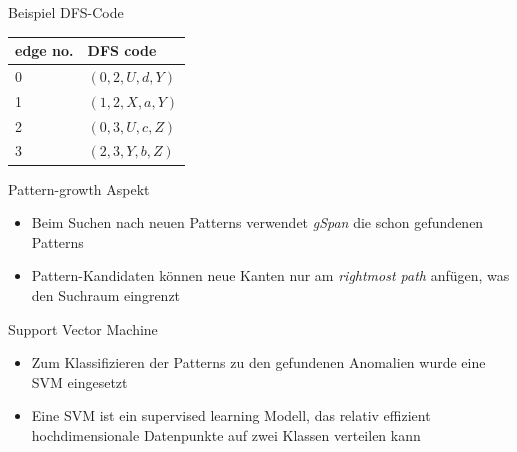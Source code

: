 \documentclass{beamer}
\begin{document}
\begin{frame}{Beispiel DFS-Code}
\begin{figure}
    \centering
    \label{fig:example_graph_dfs}
\end{figure}
\begin{table}[h]
    \centering
    \label{table:dummy_min_dfs_codes}
    \begin{tabular}{l|l}
        edge no. & DFS code          \\ \hline
        0        & $(0,2,U,d,Y)$     \\
        1        & $(1, 2, X, a, Y)$ \\
        2        & $(0, 3, U, c,Z)$  \\
        3        & $(2, 3, Y, b, Z)$
    \end{tabular}
\end{table}
\end{frame}

\begin{frame}{Pattern-growth Aspekt}
\begin{itemize}
    \item Beim Suchen nach neuen Patterns verwendet \textit{gSpan} die schon gefundenen Patterns
    \item Pattern-Kandidaten können neue Kanten nur am \textit{rightmost path} anfügen, was den Suchraum eingrenzt
\end{itemize}
\end{frame}

\begin{frame}{Support Vector Machine}
\begin{itemize}
    \item Zum Klassifizieren der Patterns zu den gefundenen Anomalien wurde eine SVM eingesetzt
    \item Eine SVM ist ein supervised learning Modell, das relativ effizient hochdimensionale Datenpunkte auf zwei Klassen verteilen kann
\end{itemize}
\end{frame}
\end{document}

